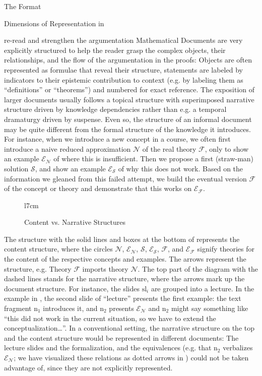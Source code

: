 \begin{omgroup}[creators=miko,id=spec-intro]{The {\omdoc} Format}
\begin{omgroup}[id=syntax-semantics]{Dimensions of Representation in {\omdoc}}
\begin{newpart}{re-read and strengthen the argumentation}
Mathematical Documents are very explicitly structured to help the reader grasp the complex
objects, their relationships, and the flow of the argumentation in the proofs: Objects are
often represented as formulae that reveal their structure, statements are labeled by
indicators to their epistemic contribution to context (e.g. by labeling them as
``definitions'' or ``theorems'') and numbered for exact reference. The exposition of
larger documents usually follows a topical structure with superimposed narrative structure
driven by knowledge dependencies rather than e.g. a temporal dramaturgy driven by
suspense.  Even so, the structure of an informal document may be quite different from the
formal structure of the knowledge it introduces. For instance, when we introduce a new
concept in a course, we often first introduce a naive reduced approximation $\mathcal{N}$
of the real theory $\mathcal{F}$, only to show an example $\mathcal{E_N}$ of where this is
insufficient. Then we propose a first (straw-man) solution $\mathcal{S}$, and show an
example $\mathcal{E_S}$ of why this does not work. Based on the information we gleaned
from this failed attempt, we build the eventual version $\mathcal{F}$ of the concept or
theory and demonstrate that this works on $\mathcal{E_F}$.

\begin{figure}l{7cm}
\caption{Content vs. Narrative Structures}\label{fig:straw-man}
\end{figure}
The structure with the solid lines and boxes at the bottom of {}
represents the content structure, where the circles $\mathcal{N}$, $\mathcal{E_N}$,
$\mathcal{S}$, $\mathcal{E_S}$, $\mathcal{F}$, and $\mathcal{E_F}$ signify theories for
the content of the respective concepts and examples. The arrows represent the
{} structure, e.g. Theory $\mathcal{F}$ imports theory
$\mathcal{N}$. The top part of the diagram with the dashed lines stands for the narrative
structure, where the arrows mark up the document structure. For instance, the slides
$\text{sl}_i$ are grouped into a lecture. In the example in {}, the
second slide of ``lecture'' presents the first example: the text fragment $\text{n}_1$
introduces it, and $\text{n}_2$ presents $\mathcal{E_N}$ and $\text{n}_2$ might say
something like ``this did not work in the current situation, so we have to extend the
conceptualization\ldots''. In a conventional setting, the narrative structure on the top
and the content structure would be represented in different documents: The lecture slides
and the formalization, and the equivalences (e.g. that $\text{n}_2$ verbalizes
$\mathcal{E_N}$; we have visualized these relations as dotted arrows in
{}) could not be taken advantage of, since they are not explicitly
represented.


\end{newpart}
\end{omgroup}
\end{omgroup}
